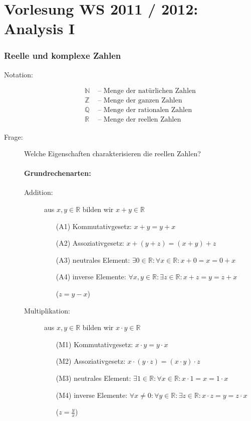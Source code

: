 \documentclass[12pt,a4paper,leqno]{article}
\author{Martin Dreher}
\begin{document}
\part*{Vorlesung WS 2011 / 2012: Analysis I}

\section{Reelle und komplexe Zahlen}

\begin{description}
\item[Notation:]
\begin{align*}
\mathbb{N} &\textrm{ -- Menge der natürlichen Zahlen}\\
\mathbb{Z} &\textrm{ -- Menge der ganzen Zahlen}\\
\mathbb{Q} &\textrm{ -- Menge der rationalen Zahlen}\\
\mathbb{R} &\textrm{ -- Menge der reellen Zahlen}
\end{align*}

\item[Frage:] Welche Eigenschaften charakterisieren die reellen Zahlen?
\subsection*{Grundrechenarten:} 
\begin{description}
\item[Addition:] aus $x, y \in \mathbb{R}$ bilden wir $x+y\in \mathbb{R}$
\begin{itemize}
\item[(A1)] Kommutativgesetz: $x + y = y + x$
\item[(A2)] Assoziativgesetz: $x + (y + z) = (x + y) + z$
\item[(A3)] neutrales Element: $\exists 0 \in \mathbb{R} : \forall x \in \mathbb{R} : x + 0 = x = 0 + x$
\item[(A4)] inverse Elemente: $\forall x, y \in \mathbb{R} : \exists z \in \mathbb{R} : x + z = y = z + x$ \begin{flushright}
($z = y - x$)
\end{flushright}
\end{itemize}

\item[Multiplikation:] aus $x, y \in \mathbb{R}$ bilden wir $x\cdot y\in \mathbb{R}$
\begin{itemize}
\item[(M1)] Kommutativgesetz: $x \cdot y = y \cdot x$
\item[(M2)] Assoziativgesetz: $x \cdot (y \cdot z) = (x \cdot y) \cdot z$
\item[(M3)] neutrales Element: $\exists 1 \in \mathbb{R} : \forall x \in \mathbb{R} : x \cdot 1 = x = 1 \cdot x$
\item[(M4)] inverse Elemente: $\forall x \neq 0 : \forall y \in \mathbb{R} : \exists z \in \mathbb{R} : x \cdot z = y = z \cdot x$ \begin{flushright}
($z = \frac{y}{x}$)
\end{flushright}
\end{itemize}
\end{description}


\end{description}
\end{document}
